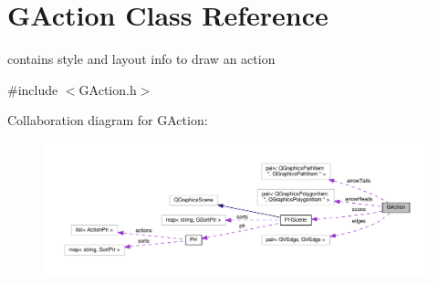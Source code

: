 \hypertarget{classGAction}{\section{G\+Action Class Reference}
\label{classGAction}
}


contains style and layout info to draw an action  




{\ttfamily \#include $<$G\+Action.\+h$>$}



Collaboration diagram for G\+Action\+:\nopagebreak
\begin{figure}[H]
\begin{center}
\leavevmode
\includegraphics[width=350pt]{classGAction__coll__graph}
\end{center}
\end{figure}
